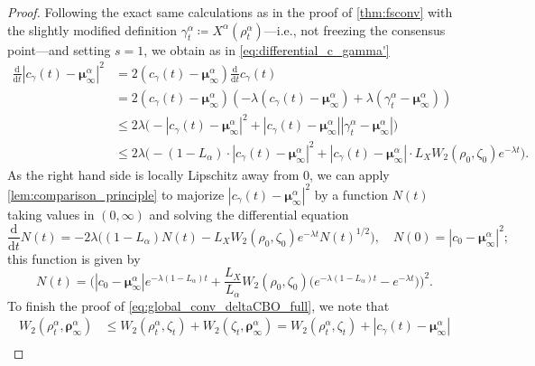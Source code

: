 \documentclass[reqno]{amsart}
\numberwithin{algorithm}{section}
\newcommand{\diff}{\mathrm{d}}
\newcommand{\Xalpha}{{X^\alpha}}
\begin{document}
{\begin{proof}
    Following the exact same calculations as in the proof of \cref{thm:fsconv} with the slightly modified definition $\gamma_t^\alpha \coloneqq \Xalpha(\rho_t^\alpha)$---i.e., not freezing the consensus point---and setting $s = 1$, we obtain
    as in \cref{eq:differential_c_gamma'}
    \begin{equation}\label{eq:differential_c_gamma}
        \begin{split}
            \frac{\diff}{\diff t} |c_\gamma(t) - \boldsymbol\mu_\infty^\alpha|^2 &= 2 (c_\gamma(t) - \boldsymbol\mu_\infty^\alpha) \frac{\diff}{\diff t} c_\gamma(t) \\
            &= 2 (c_\gamma(t) - \boldsymbol\mu_\infty^\alpha) (-\lambda (c_\gamma(t) - \boldsymbol\mu_\infty^\alpha) + \lambda (\gamma_t^\alpha - \boldsymbol\mu_\infty^\alpha)) \\
            &\leq 2 \lambda \Big( - |c_\gamma(t) - \boldsymbol\mu_\infty^\alpha|^2  + |c_\gamma(t) - \boldsymbol\mu_\infty^\alpha| | \gamma_t^\alpha - \boldsymbol\mu_\infty^\alpha| \Big) \\
            &\leq 2 \lambda \Big( - (1 - L_\alpha) \cdot |c_\gamma(t) - \boldsymbol\mu_\infty^\alpha|^2 + |c_\gamma(t) - \boldsymbol\mu_\infty^\alpha| \cdot L_X W_2(\rho_0, \zeta_0) e^{-\lambda t} \Big).
        \end{split}
    \end{equation}
    As the right hand side is locally Lipschitz away from $0$, we can apply \cref{lem:comparison_principle} to majorize $|c_\gamma(t) - \boldsymbol\mu_\infty^\alpha|^2$ by a function $N(t)$ taking values in $(0, \infty)$ and solving the differential equation
    \begin{equation}
        \frac{\diff}{\diff t} N(t) = - 2\lambda \bigg((1 - L_\alpha) N(t) - L_X W_2(\rho_0, \zeta_0) e^{-\lambda t} N(t)^{1/2}\bigg), \quad N(0) = |c_0 - \boldsymbol\mu_\infty^\alpha|^2;
    \end{equation}
    this function is given by 
    \begin{equation}
        N(t) = \bigg(|c_0 - \boldsymbol\mu_\infty^\alpha| e^{-\lambda (1 - L_\alpha) t} + \frac{L_X}{L_\alpha} W_2(\rho_0, \zeta_0) \big(e^{-\lambda (1 - L_\alpha)t} - e^{-\lambda t}\big)\bigg) ^ 2.
    \end{equation}
    To finish the proof of \cref{eq:global_conv_deltaCBO_full}, we note that
    \begin{align*}
        W_2(\rho_t^\alpha, \boldsymbol\rho_\infty^\alpha) &\leq W_2(\rho_t^\alpha, \zeta_t) + W_2(\zeta_t, \boldsymbol\rho_\infty^\alpha) = W_2(\rho_t^\alpha, \zeta_t) + |c_\gamma(t) - \boldsymbol\mu_\infty^\alpha| \\

\end{align*}
\end{proof}}
\end{document}
